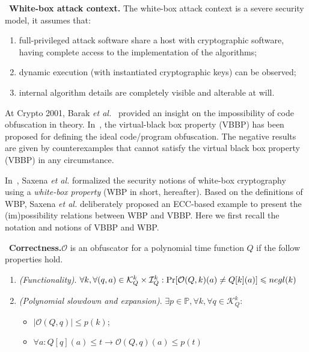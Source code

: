 \documentclass{SCIS2018}
\begin{document}
\cite{DBLP:conf/sacrypt/ChowEJO02}~\textbf{White-box attack context.} {The white-box attack context is a severe security model, it assumes that:}

\begin{enumerate}
\item full-privileged attack software share a host with cryptographic software, having complete access to the implementation of the algorithms;

\item dynamic execution (with instantiated cryptographic keys) can be observed;

\item internal algorithm details are completely visible and alterable at will.
\end{enumerate}


At Crypto 2001, Barak \textit{et al.}~\cite{DBLP:conf/crypto/BarakGIRSVY01,DBLP:journals/jacm/BarakGIRSVY12} provided an insight on the impossibility of code obfuscation in theory. In~\cite{DBLP:conf/crypto/BarakGIRSVY01}, the virtual-black box property (VBBP) has been proposed for defining the ideal code/program obfuscation. The negative results are given by counterexamples that cannot satisfy the virtual black box property (VBBP) in any circumstance.

In~\cite{DBLP:conf/isw/SaxenaWP09}, Saxena \textit{et al.} formalized the security notions of white-box cryptography using a \textit{white-box property} (WBP in short, hereafter). Based on the definitions of WBP, Saxena \textit{et al.} deliberately proposed an ECC-based example to present the (im)possibility relations between WBP and VBBP. Here we first recall the notation and notions of VBBP and WBP.

\cite{DBLP:conf/isw/SaxenaWP09}~\textbf{Correctness.}{$\mathcal{O}$ is an obfuscator for a polynomial time function $Q$ if the follow properties hold.}
\begin{enumerate}

\item \textit{(Functionality)}. $\forall k, \forall (q,a)\in \mathcal{K}^{k}_{Q}\times \mathcal{I}^{k}_{Q}:\textmd{Pr}[\mathcal{O}(Q,k)(a) \neq Q [k](a)]\leq negl(k)$

\item \textit{(Polynomial slowdown and expansion)}. $\exists p \in \mathbb{P}, \forall k, \forall q \in \mathcal{K}^{k}_{Q}:$
\begin{itemize}
    \item $|\mathcal{O}(Q, q)| \leq p(k)$;
    \item $\forall a: Q[q](a) \leq t \rightarrow \mathcal{O}(Q,q)(a) \leq p(t)$
\end{itemize}
\end{enumerate}
\end{document}

